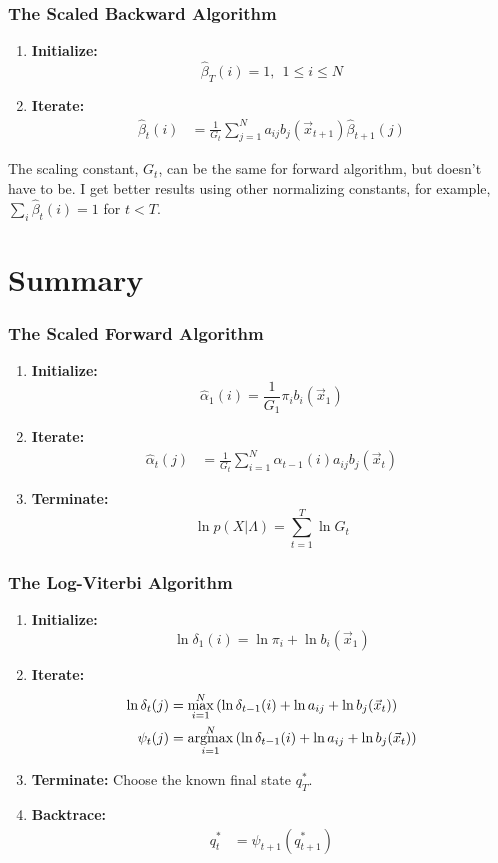 \documentclass{beamer}
\newcommand{\argmax}{\operatornamewithlimits{argmax}}
\begin{document}
\begin{frame}
  \frametitle{The Scaled Backward Algorithm}

  \begin{enumerate}
  \item {\bf Initialize:}
    \[
    \hat\beta_T(i) = 1,~~1\le i\le N
    \]
  \item {\bf Iterate:}
    \begin{align*}
      \hat\beta_{t}(i) &= \frac{1}{G_t}\sum_{j=1}^N a_{ij}b_j(\vec{x}_{t+1})\hat\beta_{t+1}(j)
    \end{align*}
  \end{enumerate}
  The scaling constant, $G_t$, can be the same for forward algorithm,
  but doesn't have to be.  I get better results using other
  normalizing constants, for example, $\sum_i\hat\beta_t(i)=1$ for
  $t<T$.
\end{frame}

\section[Summary]{Summary}
\setcounter{subsection}{1}

\begin{frame}
  \frametitle{The Scaled Forward Algorithm}

  \begin{enumerate}
  \item {\bf Initialize:}
    \[
    \hat\alpha_1(i) = \frac{1}{G_1}\pi_i b_i(\vec{x}_1)
    \]
  \item {\bf Iterate:}
    \begin{align*}
      \hat\alpha_{t}(j) &=
      \frac{1}{G_t}\sum_{i=1}^N \hat\alpha_{t-1}(i) a_{ij}b_j(\vec{x}_t)
    \end{align*}
  \item {\bf Terminate:}
    \[
    \ln p(X|\Lambda) = \sum_{t=1}^T \ln G_t
    \]
  \end{enumerate}
\end{frame}

\begin{frame}
  \frametitle{The Log-Viterbi Algorithm}

  \begin{enumerate}
  \item {\bf Initialize:}
    \[
    \ln\delta_1(i) = \ln\pi_i +\ln b_i(\vec{x}_1)
    \]
  \item {\bf Iterate:}
    \begin{align*}
      \ln\delta_{t}(j) &= \max_{i=1}^N\left(\ln\delta_{t-1}(i) +\ln a_{ij}+ \ln b_j(\vec{x}_t)\right)\\
      \psi_{t}(j) &= \argmax_{i=1}^N\left(\ln\delta_{t-1}(i) +\ln a_{ij}+ \ln b_j(\vec{x}_t)\right)
    \end{align*}
  \item {\bf Terminate:}
    Choose the known final state $q_T^*$.
  \item {\bf Backtrace:}
    \begin{align*}
      q_t^* &= \psi_{t+1}\left(q_{t+1}^*\right)
    \end{align*}
  \end{enumerate}
\end{frame}
\end{document}
